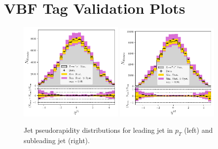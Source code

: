 

\chapter{VBF Tag \Zee Validation Plots}



\begin{figure}[h!]
    \begin{center}
        \includegraphics[width=0.45\textwidth]{figures/appendix_zee/lead_jet_eta_zee_PS.pdf}
        \includegraphics[width=0.45\textwidth]{figures/appendix_zee/sublead_jet_eta_zee_PS.pdf}
    \end{center}
    \caption{Jet pseudorapidity distributions for leading jet in $p_T$ (left) and subleading jet (right).}
\end{figure}

